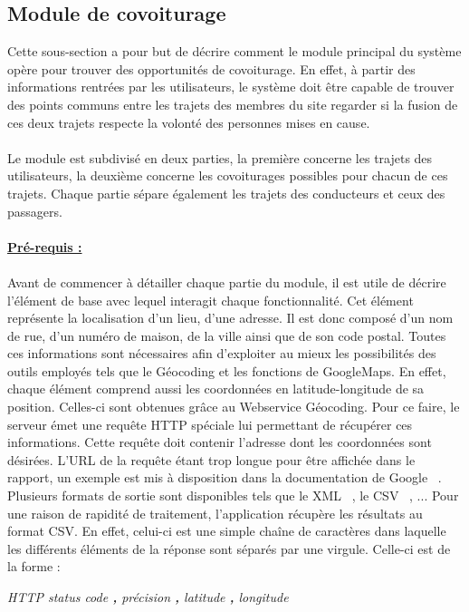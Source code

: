 \documentclass[12pt, a4paper, oneside]{article}
\begin{document}
\subsection{Module de covoiturage} \label{covoiturage}
    Cette sous-section a pour but de décrire comment le module principal du système opère pour trouver des opportunités de covoiturage. En effet, à partir des informations rentrées par les utilisateurs, le système doit être capable de trouver des points communs entre les trajets des membres du site regarder si la fusion de ces deux trajets respecte la volonté des personnes mises en cause.\\\\
    \indent Le module est subdivisé en deux parties, la première concerne les trajets des utilisateurs, la deuxième concerne les covoiturages possibles pour chacun de ces trajets. Chaque partie sépare également les trajets des conducteurs et ceux des passagers.\\\\
    \underline{\textbf{Pré-requis :}}\\\\
    \indent Avant de commencer à détailler chaque partie du module, il est utile de décrire l'élément de base avec lequel interagit chaque fonctionnalité. Cet élément représente la localisation d'un lieu, d'une adresse. Il est donc composé d'un nom de rue, d'un numéro de maison, de la ville ainsi que de son code postal. Toutes ces informations sont nécessaires afin d'exploiter au mieux les possibilités des outils employés tels que le Géocoding et les fonctions de GoogleMaps. En effet, chaque élément comprend aussi les coordonnées en latitude-longitude de sa position. Celles-ci sont obtenues grâce au Webservice Géocoding. Pour ce faire, le serveur émet une requête HTTP spéciale lui permettant de récupérer ces informations. Cette requête doit contenir l'adresse dont les coordonnées sont désirées. L'URL de la requête étant trop longue pour être affichée dans le rapport, un exemple est mis à disposition dans la documentation de Google ~\cite{google-geodoc}. Plusieurs formats de sortie sont disponibles tels que le XML ~\cite{XML}, le CSV ~\cite{CSV}, ... Pour une raison de rapidité de traitement, l'application récupère les résultats au format CSV. En effet, celui-ci est une simple chaîne de caractères dans laquelle les différents éléments de la réponse sont séparés par une virgule. Celle-ci est de la forme :
    \begin{center}
        \textit{HTTP status code \textbf{,} précision \textbf{,} latitude \textbf{,} longitude}
    \end{center}
\end{document}
